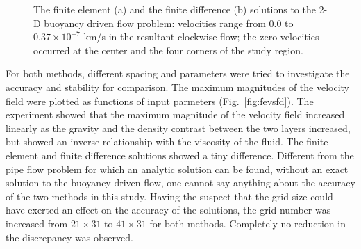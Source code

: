 \documentclass[12pt]{article}
\numberwithin{figure}{section}  %
\numberwithin{equation}{section}  %
\begin{document}
\begin{multicols}{2}
\begin{figure}[!htb]
	\centering
	\caption{The finite element (a) and the finite difference (b) solutions to the 2-D buoyancy driven flow problem: velocities range from $0.0$ to $0.37\times10^{-7}$ km/s in the resultant clockwise flow; the zero velocities occurred at the center and the four corners of the study region.}
	\label{fig:solutions}
\end{figure}

For both methods, different spacing and parameters were tried to investigate the accuracy and stability for comparison. The maximum magnitudes of the velocity field were plotted as functions of input parmeters (Fig.\ \ref{fig:fevsfd}). The experiment showed that the maximum magnitude of the velocity field increased linearly as the gravity and the density contrast between the two layers increased, but showed an inverse relationship with the viscosity of the fluid. The finite element and finite difference solutions showed a tiny difference. Different from the pipe flow problem for which an analytic solution can be found, without an exact solution to the buoyancy driven flow, one cannot say anything about the accuracy of the two methods in this study. Having the suspect that the grid size could have exerted an effect on the accuracy of the solutions, the grid number was increased from $21\times31$ to $41\times31$ for both methods. Completely no reduction in the discrepancy was observed.


\end{multicols}
\end{document}
